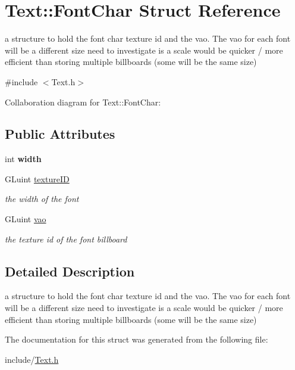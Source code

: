 \hypertarget{struct_text_1_1_font_char}{\section{Text\-:\-:Font\-Char Struct Reference}
\label{struct_text_1_1_font_char}
}


a structure to hold the font char texture id and the vao. The vao for each font will be a different size need to investigate is a scale would be quicker / more efficient than storing multiple billboards (some will be the same size)  




{\ttfamily \#include $<$Text.\-h$>$}



Collaboration diagram for Text\-:\-:Font\-Char\-:
\subsection*{Public Attributes}
\begin{DoxyCompactItemize}
\item 
\hypertarget{struct_text_1_1_font_char_abbf7e80a16c3190894c5a9e195180bd8}{int {\bfseries width}}\label{struct_text_1_1_font_char_abbf7e80a16c3190894c5a9e195180bd8}

\item 
\hypertarget{struct_text_1_1_font_char_a7ef075790be18e9bac4bfbb56b528428}{G\-Luint \hyperlink{struct_text_1_1_font_char_a7ef075790be18e9bac4bfbb56b528428}{texture\-I\-D}}\label{struct_text_1_1_font_char_a7ef075790be18e9bac4bfbb56b528428}

\begin{DoxyCompactList}\small\item\em the width of the font \end{DoxyCompactList}\item 
\hypertarget{struct_text_1_1_font_char_a763c6e3ecbe30d33becd27b8c7310d39}{G\-Luint \hyperlink{struct_text_1_1_font_char_a763c6e3ecbe30d33becd27b8c7310d39}{vao}}\label{struct_text_1_1_font_char_a763c6e3ecbe30d33becd27b8c7310d39}

\begin{DoxyCompactList}\small\item\em the texture id of the font billboard \end{DoxyCompactList}\end{DoxyCompactItemize}


\subsection{Detailed Description}
a structure to hold the font char texture id and the vao. The vao for each font will be a different size need to investigate is a scale would be quicker / more efficient than storing multiple billboards (some will be the same size) 

The documentation for this struct was generated from the following file\-:\begin{DoxyCompactItemize}
\item 
include/\hyperlink{_text_8h}{Text.\-h}\end{DoxyCompactItemize}
